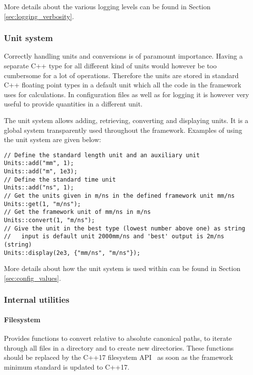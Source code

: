 More details about the various logging levels can be found in Section \ref{sec:logging_verbosity}.

\subsubsection{Unit system}
\label{sec:unit_system}
Correctly handling units and conversions is of paramount importance. Having a separate C++ type for all different kind of units would however be too cumbersome for a lot of operations. Therefore the units are stored in standard C++ floating point types in a default unit which all the code in the framework uses for calculations. In configuration files as well as for logging it is however very useful to provide quantities in a different unit.

The unit system allows adding, retrieving, converting and displaying units. It is a global system transparently used throughout the framework. Examples of using the unit system are given below:
\begin{verbatim}
// Define the standard length unit and an auxiliary unit
Units::add("mm", 1); 
Units::add("m", 1e3); 
// Define the standard time unit
Units::add("ns", 1); 
// Get the units given in m/ns in the defined framework unit mm/ns
Units::get(1, "m/ns"); 
// Get the framework unit of mm/ns in m/ns 
Units::convert(1, "m/ns");
// Give the unit in the best type (lowest number above one) as string 
//   input is default unit 2000mm/ns and 'best' output is 2m/ns (string)
Units::display(2e3, {"mm/ns", "m/ns"}); 
\end{verbatim}

More details about how the unit system is used within \apsq can be found in Section \ref{sec:config_values}.

\subsubsection{Internal utilities}
\paragraph{Filesystem}
\label{sec:filesystem}
Provides functions to convert relative to absolute canonical paths, to iterate through all files in a directory and to create new directories. These functions should be replaced by the C++17 filesystem API~\cite{cppfilesystem} as soon as the framework minimum standard is updated to C++17.


